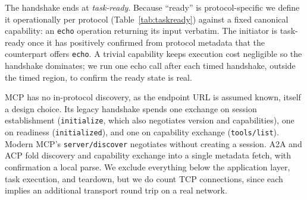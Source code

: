 \documentclass{article}
\newcommand{\code}[1]{\mbox{\texttt{#1}}}
\begin{document}
The handshake ends at \emph{task-ready}. Because ``ready'' is
protocol-specific we define it operationally per protocol
(Table~\ref{tab:taskready}) against a fixed canonical capability: an
\code{echo} operation returning its input verbatim. The initiator is
task-ready once it has positively confirmed from protocol metadata that the
counterpart offers \code{echo}. A trivial capability keeps execution cost
negligible so the handshake dominates; we run one echo call after each
timed handshake, outside the timed region, to confirm the ready state is
real.

MCP has no in-protocol discovery, as the endpoint URL is assumed known,
itself a design choice. Its legacy handshake spends one exchange on session
establishment (\code{initialize}, which also negotiates version and
capabilities), one on readiness (\code{initialized}), and one on capability
exchange (\code{tools/list}). Modern MCP's \code{server/discover}
negotiates without creating a session. A2A and ACP fold discovery and
capability exchange into a single metadata fetch, with confirmation a local
parse. We exclude everything below the application layer, task execution,
and teardown, but we do count TCP connections, since each implies an
additional transport round trip on a real network.
\end{document}
